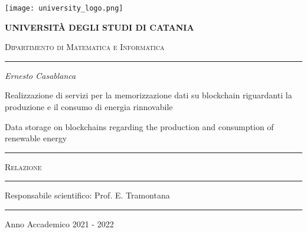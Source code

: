\begin{titlepage}
    \centering
    \texttt{[image: university\_logo.png]}

    \bigskip

    {\Large \textbf{UNIVERSITÀ DEGLI STUDI DI CATANIA}}

    {\scshape
        \large
        Dipartimento di Matematica e Informatica
    }

    \bigskip

    \hrule

    \bigskip
    \bigskip
    \bigskip
    \bigskip

    {\itshape
        \large
        Ernesto Casablanca
        \par}

    \bigskip
    \bigskip
    \bigskip
    \bigskip

    {\centering
        \Large
        Realizzazione di servizi per la memorizzazione dati su blockchain riguardanti
        la produzione e il consumo di energia rinnovabile
        \par}
    \vspace{5mm}
    {\centering
        Data storage on blockchains regarding the production and consumption of renewable energy
        \par}

    \bigskip
    \bigskip
    \bigskip
    \bigskip
    \bigskip
    \bigskip

    \begin{minipage}[b]{8 cm}
        \hrule
        \bigskip
        {\centering\scshape
            Relazione
            \par}
        \bigskip
        \hrule
    \end{minipage}

    \bigskip
    \bigskip
    \bigskip
    \bigskip
    \bigskip
    \bigskip
    \bigskip
    \bigskip
    \bigskip
    \bigskip
    \bigskip

    {\raggedleft
        Responsabile scientifico: Prof. E. Tramontana
        \par}

    \bigskip
    \bigskip
    \bigskip
    \bigskip

    \hrule

    \bigskip

    {\centering
        Anno Accademico 2021 - 2022
        \par}

\end{titlepage}
